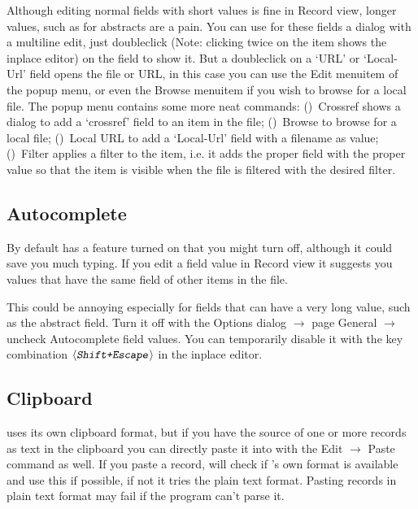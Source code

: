 \documentclass[oneside,10pt]{article}
\newcommand{\keystroke}[1]{$\langle\hbox{\texttt{\textsl{#1}}}\rangle$}
\begin{document}
Although editing normal fields with short values is fine in Record view, longer
values, such as for abstracts are a pain. You can use for these fields a dialog with
a multiline edit, just doubleclick (Note: clicking twice on the item shows the
inplace editor) on the field to show it. But a doubleclick on a `URL' or `Local-Url'
field opens the file or URL, in this case you can use the Edit menuitem of the
popup menu, or even the Browse menuitem if you wish to browse for a local file.
The popup menu contains some more neat commands: (\textbullet)~Crossref shows a
dialog to add a `crossref' field to an item in the file; (\textbullet)~Browse to
browse for a local file; (\textbullet)~Local URL to add a `Local-Url' field with
a filename as value; (\textbullet)~Filter
applies a filter to the item, i.e. it adds the proper field with the proper
value so that the item is visible when the file is filtered with the desired filter.

\subsection{Autocomplete}
\label{sec:Autocomplete}

By default \BibEdt{} has a feature turned on that you might
turn off, although it could save you much typing. If you edit a field value in
Record view it suggests you values that have the same field of other
items in the file.

This could be annoying especially for fields that can have a very long value,
such as the abstract field. Turn it off with the Options dialog $\rightarrow$ page
General $\rightarrow$ uncheck Autocomplete field values. You can temporarily disable
it with the key combination \keystroke{Shift+Escape} in the inplace editor.

\subsection{Clipboard}
\label{sec:Clipboard}

\BibEdt{} uses its own clipboard format,
but if you have the source of one or more \BibTeX{} records as text in the clipboard
you can directly paste it into \BibEdt{} with the Edit $\rightarrow$ Paste
command as well. If you paste a record, \BibEdt{} will check if \BibEdt{}'s own format
is available and use this if possible, if not it tries the plain text format. Pasting
records in plain text format may fail if the program can't parse it.
\end{document}

